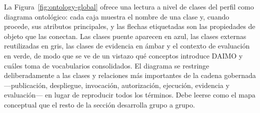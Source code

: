 \documentclass[Afour,sagev,times]{sagej}
\begin{document}
La Figura~\ref{fig:ontology-global} ofrece una lectura a nivel de clases del perfil como diagrama ontológico: cada caja muestra el nombre de una clase y, cuando procede, sus atributos principales, y las flechas etiquetadas son las propiedades de objeto que las conectan. Las clases puente aparecen en azul, las clases externas reutilizadas en gris, las clases de evidencia en ámbar y el contexto de evaluación en verde, de modo que se ve de un vistazo qué conceptos introduce DAIMO y cuáles toma de vocabularios consolidados. El diagrama se restringe deliberadamente a las clases y relaciones más importantes de la cadena gobernada ---publicación, despliegue, invocación, autorización, ejecución, evidencia y evaluación--- en lugar de reproducir todos los términos. Debe leerse como el mapa conceptual que el resto de la sección desarrolla grupo a grupo.
\end{document}

